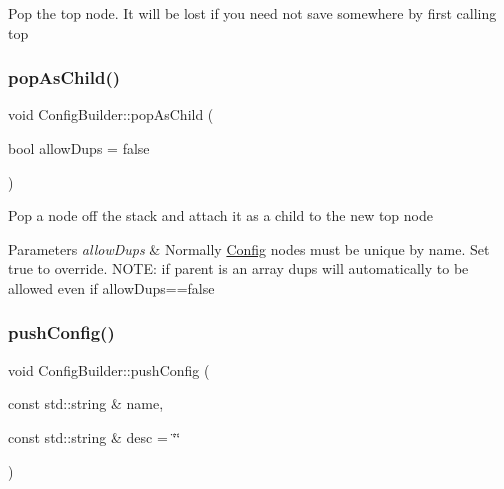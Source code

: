 Pop the top node. It will be lost if you need not save somewhere by first calling top \mbox{\label{classtheoria_1_1config_1_1ConfigBuilder_acd995045c0bf17d35da9573cf53ec791}} 
\subsubsection{\texorpdfstring{pop\+As\+Child()}{popAsChild()}}
{\footnotesize\ttfamily void Config\+Builder\+::pop\+As\+Child (\begin{DoxyParamCaption}\item[{bool}]{allow\+Dups = {\ttfamily false} }\end{DoxyParamCaption})}

Pop a node off the stack and attach it as a child to the new top node 
\begin{DoxyParams}{Parameters}
{\em allow\+Dups} & Normally \hyperlink{classtheoria_1_1config_1_1Config}{Config} nodes must be unique by name. Set true to override. N\+O\+TE\+: if parent is an array dups will automatically to be allowed even if allow\+Dups==false \\
\hline
\end{DoxyParams}
\mbox{\label{classtheoria_1_1config_1_1ConfigBuilder_ad7542393581c33259aae6d07d11391dd}} 
\subsubsection{\texorpdfstring{push\+Config()}{pushConfig()}\hspace{0.1cm}{\footnotesize\ttfamily [1/2]}}
{\footnotesize\ttfamily void Config\+Builder\+::push\+Config (\begin{DoxyParamCaption}\item[{const std\+::string \&}]{name,  }\item[{const std\+::string \&}]{desc = {\ttfamily \char`\"{}\char`\"{}} }\end{DoxyParamCaption})}

